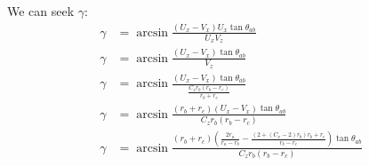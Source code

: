 \documentclass{article}
\begin{document}
We can seek $\gamma$:
\begin{align}
  \gamma &= \arcsin{\frac{(U_x - V_x)U_x\tan{\theta_{ab}}}{U_xV_z}} \\
  \gamma &= \arcsin{\frac{(U_x - V_x)\tan{\theta_{ab}}}{V_z}} \\
  \gamma &= \arcsin{\frac{(U_x - V_x)\tan{\theta_{ab}}}{\frac{C_z r_b (r_b - r_c)}{r_b + r_c}}} \\
  \gamma &= \arcsin{\frac{(r_b + r_c)(U_x - V_x)\tan{\theta_{ab}}}{C_z r_b (r_b - r_c)}} \\
  \gamma &= \arcsin{\frac{(r_b + r_c)(\frac{2 r_a}{r_a - r_b} - \frac{(2 + (C_x - 2) r_b) r_b + r_c}{r_b - r_c})\tan{\theta_{ab}}}{C_z r_b (r_b - r_c)}} \\
\end{align}



























\end{document}
